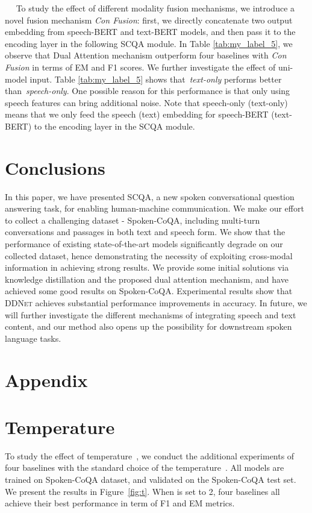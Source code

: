 \documentclass[11pt]{article}
\newcommand{\myparagraph}[1]{\vspace{2pt}\noindent{\bf{#1}}~~}
\begin{document}
\myparagraph{Multi-Modality Fusion Mechanism.}
To study the effect of different modality fusion mechanisms, we introduce a novel fusion mechanism \textit{Con Fusion}: first, we directly concatenate two output embedding from speech-BERT and text-BERT models, and then pass it to the encoding layer in the following SCQA module. In Table \ref{tab:my_label_5}, we observe that Dual Attention mechanism outperform four baselines with \textit{Con Fusion} in terms of EM and F1 scores. We further investigate the effect of uni-model input. Table \ref{tab:my_label_5} shows that~\textit{text-only} performs better than~\textit{speech-only}. One possible reason for this performance is that only using speech features can bring additional noise. Note that speech-only (text-only) means that we only feed the speech (text) embedding for speech-BERT (text-BERT) to the encoding layer in the SCQA module. 
\section{Conclusions}
In this paper, we have presented SCQA, a new spoken conversational question answering task, for enabling human-machine communication. We make our effort to collect a challenging dataset - Spoken-CoQA, including multi-turn conversations and passages in both text and speech form. We show that the performance of existing state-of-the-art models significantly degrade on our collected dataset, hence demonstrating the necessity of exploiting cross-modal information in achieving strong results. We provide some initial solutions via knowledge distillation and the proposed dual attention mechanism, and have achieved some good results on Spoken-CoQA. Experimental results show that \textsc{DDNet} achieves substantial performance improvements in accuracy.
In future, we will further investigate the different mechanisms of integrating speech and text content, and our method also opens up the possibility for downstream spoken language tasks.
 




\appendix

\section*{Appendix}
\label{sec:appendix}

\section{Temperature~}
To study the effect of temperature~, we conduct the additional experiments of four baselines with the standard choice of the temperature~. All models are trained on Spoken-CoQA dataset, and validated on the Spoken-CoQA test set. We present the results in Figure~\ref{fig:t}. When  is set to 2, four baselines all achieve their best performance in term of F1 and EM metrics.
\end{document}
